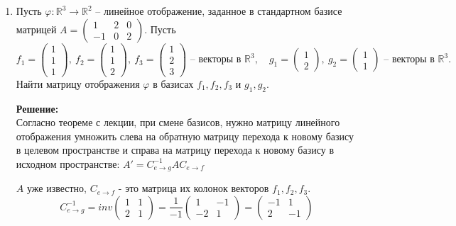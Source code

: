 \documentclass[a4paper,12pt]{article}
\begin{document}
\begin{enumerate}
\item Пусть $\varphi\colon \mathbb R^3\to \mathbb R^2$ -- линейное отображение, заданное в стандартном базисе матрицей $A = \left(\begin{smallmatrix}{1}&{2}&{0}\\{-1}&{0}&{2}\end{smallmatrix}\right)$.  Пусть
\[
f_1 = 
\begin{pmatrix}
{1}\\{1}\\{1}
\end{pmatrix},\:
f_2 = 
\begin{pmatrix}
{1}\\{1}\\{2}
\end{pmatrix},\:
f_3 = 
\begin{pmatrix}
{1}\\{2}\\{3}
\end{pmatrix}\text{ -- \ векторы в } \mathbb R^3,\quad
g_1 =
\begin{pmatrix}
{1}\\{2}
\end{pmatrix},\:
g_2 =
\begin{pmatrix}
{1}\\{1}
\end{pmatrix}\text{ -- \ векторы в } \mathbb R^3.
\]
Найти матрицу отображения $\varphi$ в базисах $f_1,f_2,f_3$ и $g_1,g_2$.

\vspace{5pt}

\textbf{Решение:}\\
Согласно теореме с лекции, при смене базисов, нужно матрицу линейного отображения умножить слева на обратную матрицу перехода к новому базису в целевом пространстве и справа на матрицу перехода к новому базису в исходном пространстве: $A' = C^{-1}_{e\rightarrow g} A C_{e\rightarrow f}$

$A$ уже известно, $C_{e\rightarrow f}$ - это матрица их колонок векторов $f_1,f_2,f_3$.
$$C^{-1}_{e\rightarrow g} = inv \begin{pmatrix}
1&1\\
2&1
\end{pmatrix} =\frac{1}{-1}\begin{pmatrix}
1&-1\\
-2&1
\end{pmatrix}=\begin{pmatrix}
-1&1\\
2&-1
\end{pmatrix}  $$


\end{enumerate}
\end{document}
